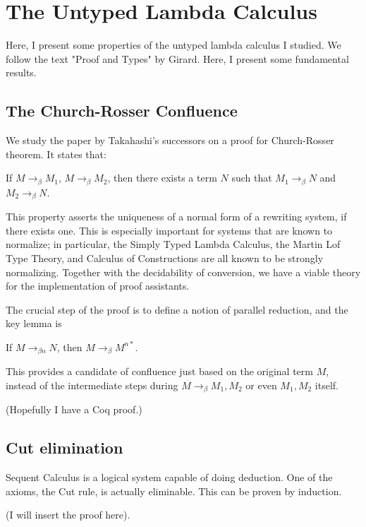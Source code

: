 \chapter{The Untyped Lambda Calculus}

Here, I present some properties of the untyped lambda calculus I studied.  We
follow the text "Proof and Types" by Girard. Here, I present some fundamental
results.

\section{The Church-Rosser Confluence}

We study the paper by Takahashi's successors on a proof for Church-Rosser 
theorem. It states that:
\begin{theorem}
If $M\to_\beta M_1$, $M\to_\beta M_2$, then there exists a term $N$ such that
$M_1\to_\beta N$ and $M_2\to_\beta N$.
\end{theorem}

This property asserts the uniqueness of a normal form of a rewriting system, if
there exists one. This is especially important for systems that are known to
normalize; in particular, the Simply Typed Lambda Calculus, the Martin Lof Type
Theory, and Calculus of Constructions are all known to be strongly normalizing.
Together with the decidability of conversion, we have a viable theory for 
the implementation of proof assistants.

The crucial step of the proof is to define a notion of parallel reduction, and
the key lemma is

\begin{lemma}
If $M\to_{\beta n}N$, then $M\to_{\beta}M^{n*}$.
\end{lemma}

This provides a candidate of confluence just based on the original term $M$,
instead of the intermediate steps during $M\to_\beta M_1,M_2$ or even $M_1, M_2$
itself.

(Hopefully I have a Coq proof.)

\section{Cut elimination}

Sequent Calculus is a logical system capable of doing deduction. One of the 
axioms, the Cut rule, is actually eliminable. This can be proven by induction.

(I will insert the proof here).